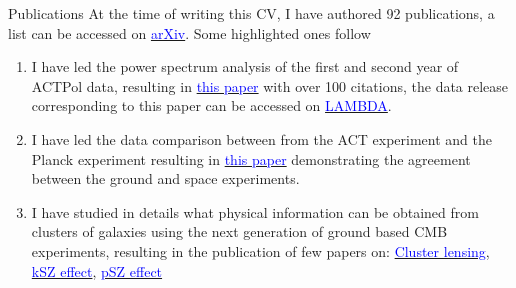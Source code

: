 \documentclass{resume} %
\newcommand{\TIB}[1]{\textcolor{blue}{#1}}
\begin{document}
\begin{rSection}{Publications}
At the time of writing this CV, I have authored 92 publications, a list can be accessed on \href{https://arxiv.org/search/astro-ph?searchtype=author&query=Louis\%2C+T}{\TIB{arXiv}}. Some highlighted ones follow
\begin{enumerate}
\item I have led the power spectrum analysis of the first and second year of ACTPol data, resulting in \href{https://ui.adsabs.harvard.edu/abs/2017JCAP...06..031L}{\TIB{this paper}} with over 100 citations, the data release corresponding to this paper can be accessed on \href{https://lambda.gsfc.nasa.gov/product/act/actpol_prod_table.cfm}{\TIB{LAMBDA}}.
\item I have led the data comparison between from the ACT experiment and the Planck experiment resulting in \href{https://ui.adsabs.harvard.edu/abs/2014JCAP...07..016L}{\TIB{this paper}} demonstrating the agreement between the ground and space experiments.
\item I have studied in details what physical information can be obtained from clusters of galaxies using the next generation of ground based CMB experiments, resulting in the publication of few papers on: \href{https://ui.adsabs.harvard.edu/abs/2017PhRvD..95d3517L}{ \TIB{Cluster lensing}},  \href{https://ui.adsabs.harvard.edu/abs/2016PhRvD..94d3522A}{ \TIB{kSZ effect}}, \href{https://journals.aps.org/prd/abstract/10.1103/PhysRevD.96.123509}{\TIB{pSZ effect}} \\

\end{enumerate}



\end{rSection}

\vspace{2cm}
\end{document}
